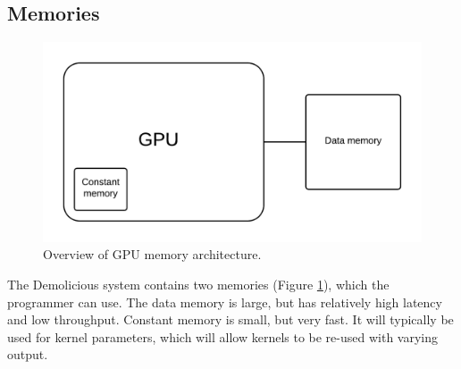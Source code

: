 \subsection{Memories}

\begin{figure}[H]
	\centering
	\includegraphics[width=\textwidth]{system_overview/diagrams/memory_overview.png}
	\caption{Overview of GPU memory architecture.}
	\label{fig:memory_overview}
\end{figure}

The Demolicious system contains two memories (Figure \ref{fig:memory_overview}), which the programmer can use.
The data memory is large, but has relatively high latency and low throughput.
Constant memory is small, but very fast.
It will typically be used for kernel parameters,
which will allow kernels to be re-used with varying output.
